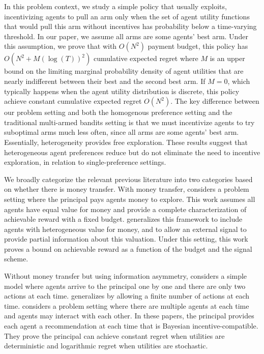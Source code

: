 \documentclass{article}
\begin{document}

In this problem context, we study a simple policy that usually exploits, incentivizing agents to pull an arm only when the set of agent utility functions that would pull this arm without incentives has probability below a time-varying threshold. In our paper, we assume all arms are some agents' best arm. Under this assumption, we prove that with $O(N^2)$ payment budget, this policy has $O(N^2+M(\log(T))^2)$ cumulative expected regret where $M$ is an upper bound on the limiting marginal probability density of agent utilities that are nearly indifferent between their best and the second best arm. If $M=0$, which typically happens when the agent utility distribution is discrete, this policy achieve constant cumulative expected regret $O(N^2)$. The key difference between our problem setting and both the homogenous preference setting and the traditional multi-armed bandits setting is that we must incentivize agents to try suboptimal arms much less often, since all arms are some agents' best arm.  Essentially, heterogeneity provides free exploration.  These results suggest that heterogeneous agent preferences reduce but do not eliminate the need to incentive exploration, in relation to single-preference settings. 

We broadly categorize the relevant previous literature into two categories based on whether there is money transfer.
With money transfer, \cite{frazier2014incentivizing} considers a problem setting where the principal pays agents money to explore. This work assumes all agents have equal value for money and provide a complete characterization of achievable reward with a fixed budget. \cite{han2015incentivizing} generalizes this framework to include agents with heterogeneous value for money, and to allow an external signal to provide partial information about this valuation. Under this setting, this work proves a bound on achievable reward as a function of the budget and the signal scheme.

Without money transfer but using information asymmetry, \cite{kremer2014implementing} considers a simple model where agents arrive to the principal one by one and there are only two actions at each time. \cite{mansour2015bayesian} generalizes \cite{kremer2014implementing} by allowing a finite number of actions at each time. \cite{mansour2016bayesian} considers a problem setting where there are multiple agents at each time and agents may interact with each other. In these papers, the principal provides each agent a recommendation at each time that is Bayesian incentive-compatible. They prove the principal can achieve constant regret when utilities are deterministic and logarithmic regret when utilities are stochastic.
\end{document}
